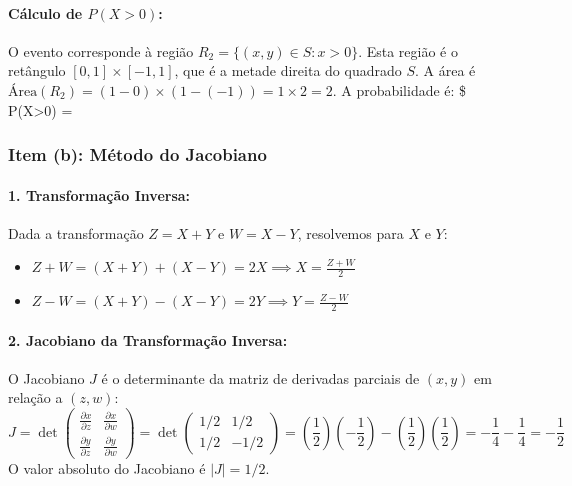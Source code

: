 \documentclass[
]{article}
\begin{document}
\paragraph{Cálculo de $P(X>0)$:}

O evento corresponde à região \(R_2 = \{ (x,y) \in S : x > 0 \}\). Esta
região é o retângulo \([0,1] \times [-1,1]\), que é a metade direita do
quadrado \(S\). A área é
\(\text{Área}(R_2) = (1-0) \times (1-(-1)) = 1 \times 2 = 2\). A
probabilidade é: \$ P(X\textgreater0) =

\subsubsection*{Item (b): Método do Jacobiano}
\paragraph{1. Transformação Inversa:}

Dada a transformação \(Z=X+Y\) e \(W=X-Y\), resolvemos para \(X\) e
\(Y\):

\begin{itemize}
    \item $Z+W = (X+Y)+(X-Y) = 2X \implies X = \frac{Z+W}{2}$
    \item $Z-W = (X+Y)-(X-Y) = 2Y \implies Y = \frac{Z-W}{2}$
\end{itemize}

\paragraph{2. Jacobiano da Transformação Inversa:}

O Jacobiano \(J\) é o determinante da matriz de derivadas parciais de
\((x,y)\) em relação a \((z,w)\):
\[ J = \det \begin{pmatrix} \frac{\partial x}{\partial z} & \frac{\partial x}{\partial w} \\ \frac{\partial y}{\partial z} & \frac{\partial y}{\partial w} \end{pmatrix} = \det \begin{pmatrix} 1/2 & 1/2 \\ 1/2 & -1/2 \end{pmatrix} = \left(\frac{1}{2}\right)\left(-\frac{1}{2}\right) - \left(\frac{1}{2}\right)\left(\frac{1}{2}\right) = -\frac{1}{4} - \frac{1}{4} = -\frac{1}{2} \]
O valor absoluto do Jacobiano é \(|J| = 1/2\).
\end{document}
